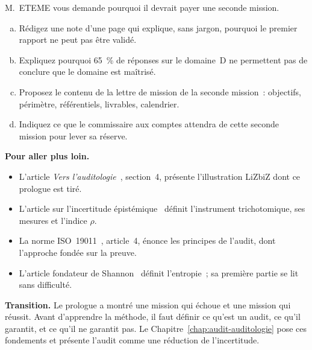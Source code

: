 \begin{boxexo}[title={\ding{45}\quad Exercice~P.10. La note au directeur général \niveauexpert}]
M.~ETEME vous demande pourquoi il devrait payer une seconde mission.
\begin{enumerate}[(a)]
    \item Rédigez une note d'une page qui explique, sans jargon, pourquoi le
          premier rapport ne peut pas être validé.
    \item Expliquez pourquoi 65~\% de réponses \OUI{} sur le domaine~D ne
          permettent pas de conclure que le domaine est maîtrisé.
    \item Proposez le contenu de la lettre de mission de la seconde
          mission~: objectifs, périmètre, référentiels, livrables,
          calendrier.
    \item Indiquez ce que le commissaire aux comptes attendra de cette
          seconde mission pour lever sa réserve.
\end{enumerate}
\end{boxexo}

\bigskip

\begin{boxinfo}
\textbf{Pour aller plus loin.}
\begin{itemize}
    \item L'article \emph{Vers l'auditologie}~\cite{minka2026auditologie},
          section~4, présente l'illustration LiZbiZ dont ce prologue est
          tiré.
    \item L'article sur l'incertitude épistémique~\cite{minka2026nek}
          définit l'instrument trichotomique, ses mesures et l'indice
          $\rho$.
    \item La norme ISO~19011~\cite{iso19011_2018}, article~4, énonce les
          principes de l'audit, dont l'approche fondée sur la preuve.
    \item L'article fondateur de Shannon~\cite{shannon1948} définit
          l'entropie~; sa première partie se lit sans difficulté.
\end{itemize}
\end{boxinfo}

\begin{boxinfo}
\textbf{Transition.} Le prologue a montré une mission qui échoue et une
mission qui réussit. Avant d'apprendre la méthode, il faut définir ce
qu'est un audit, ce qu'il garantit, et ce qu'il ne garantit pas. Le
Chapitre~\ref{chap:audit-auditologie} pose ces fondements et présente
l'audit comme une réduction de l'incertitude.
\end{boxinfo}
